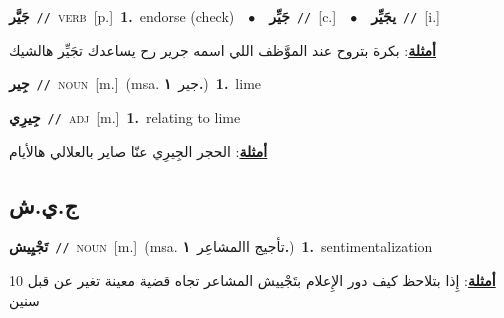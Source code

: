 \documentclass[10pt,a4paper,twoside]{article} %
\begin{document}
\begin{multicols}{2}
{\setlength\topsep{0pt}\textbf{\foreignlanguage{arabic}{جَيَّر}}\ {\color{gray}\texttt{//}\color{black}}\ \textsc{verb}\ [p.]\ \textbf{1.}~endorse (check)\ \ $\bullet$\ \ \setlength\topsep{0pt}\textbf{\foreignlanguage{arabic}{جَيِّر}}\ {\color{gray}\texttt{//}\color{black}}\ [c.]\ \ $\bullet$\ \ \setlength\topsep{0pt}\textbf{\foreignlanguage{arabic}{يجَيِّر}}\ {\color{gray}\texttt{//}\color{black}}\ [i.]\  \begin{flushright}\color{gray}\foreignlanguage{arabic}{\textbf{\underline{\foreignlanguage{arabic}{أمثلة}}}: بكرة بتروح عند الموَّظف اللي اسمه جرير رح يساعدك تجَيِّر هالشيك}\end{flushright}\color{black}} \vspace{2mm}

{\setlength\topsep{0pt}\textbf{\foreignlanguage{arabic}{جِير}}\ {\color{gray}\texttt{//}\color{black}}\ \textsc{noun}\ [m.]\ \color{gray}(msa. \foreignlanguage{arabic}{جير}~\foreignlanguage{arabic}{\textbf{١.}})\color{black}\ \textbf{1.}~lime\ } \vspace{2mm}

{\setlength\topsep{0pt}\textbf{\foreignlanguage{arabic}{جِيرِي}}\ {\color{gray}\texttt{//}\color{black}}\ \textsc{adj}\ [m.]\ \textbf{1.}~relating to lime\  \begin{flushright}\color{gray}\foreignlanguage{arabic}{\textbf{\underline{\foreignlanguage{arabic}{أمثلة}}}: الحجر الجِيرِي عنّا صاير بالعلالي هالأيام}\end{flushright}\color{black}} \vspace{2mm}

\vspace{-3mm}
\subsection*{\color{blue}\foreignlanguage{arabic}{ج.ي.ش}\color{blue}{}} 

{\setlength\topsep{0pt}\textbf{\foreignlanguage{arabic}{تَجْيِيش}}\ {\color{gray}\texttt{//}\color{black}}\ \textsc{noun}\ [m.]\ \color{gray}(msa. \foreignlanguage{arabic}{تأجيج االمشاعِر}~\foreignlanguage{arabic}{\textbf{١.}})\color{black}\ \textbf{1.}~sentimentalization\  \begin{flushright}\color{gray}\foreignlanguage{arabic}{\textbf{\underline{\foreignlanguage{arabic}{أمثلة}}}: إِذا بتلاحظ كيف دور الإِعلام بتَجْييش المشاعر تجاه قضية معينة تغير عن قبل 10 سنين}\end{flushright}\color{black}} \vspace{2mm}


\end{multicols}
\end{document}
